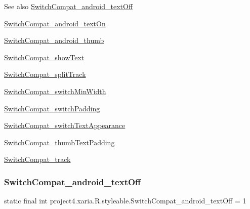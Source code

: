 \begin{DoxySeeAlso}{See also}
\hyperlink{classproject4_1_1xaria_1_1R_1_1styleable_a3f671633e0728718307fc21b5d2413c3}{Switch\+Compat\+\_\+android\+\_\+text\+Off} 

\hyperlink{classproject4_1_1xaria_1_1R_1_1styleable_addeae4c36c168e8d419f957fd6c97234}{Switch\+Compat\+\_\+android\+\_\+text\+On} 

\hyperlink{classproject4_1_1xaria_1_1R_1_1styleable_a022bff7fbd81db1814b1440617e056c3}{Switch\+Compat\+\_\+android\+\_\+thumb} 

\hyperlink{classproject4_1_1xaria_1_1R_1_1styleable_a14c2b4b128399b1f12166f13c16525d4}{Switch\+Compat\+\_\+show\+Text} 

\hyperlink{classproject4_1_1xaria_1_1R_1_1styleable_a9e4d678c79e9aa05ed9604fba7663099}{Switch\+Compat\+\_\+split\+Track} 

\hyperlink{classproject4_1_1xaria_1_1R_1_1styleable_aecb92273fe1bfad399b3793d1061e0b7}{Switch\+Compat\+\_\+switch\+Min\+Width} 

\hyperlink{classproject4_1_1xaria_1_1R_1_1styleable_a42e6a70d6b1f16cdf82c30ba3a3ac3bd}{Switch\+Compat\+\_\+switch\+Padding} 

\hyperlink{classproject4_1_1xaria_1_1R_1_1styleable_a8e811c82f279d1bba5afc81c9708b5a6}{Switch\+Compat\+\_\+switch\+Text\+Appearance} 

\hyperlink{classproject4_1_1xaria_1_1R_1_1styleable_ad2019cfb3db37eb7854eb363ab28b13c}{Switch\+Compat\+\_\+thumb\+Text\+Padding} 

\hyperlink{classproject4_1_1xaria_1_1R_1_1styleable_af96cd765a1838db8e0772f079ce6fa52}{Switch\+Compat\+\_\+track} 
\end{DoxySeeAlso}
\mbox{\label{classproject4_1_1xaria_1_1R_1_1styleable_a3f671633e0728718307fc21b5d2413c3}} 
\subsubsection{\texorpdfstring{Switch\+Compat\+\_\+android\+\_\+text\+Off}{SwitchCompat\_android\_textOff}}
{\footnotesize\ttfamily static final int project4.\+xaria.\+R.\+styleable.\+Switch\+Compat\+\_\+android\+\_\+text\+Off = 1\hspace{0.3cm}{\ttfamily [static]}}

